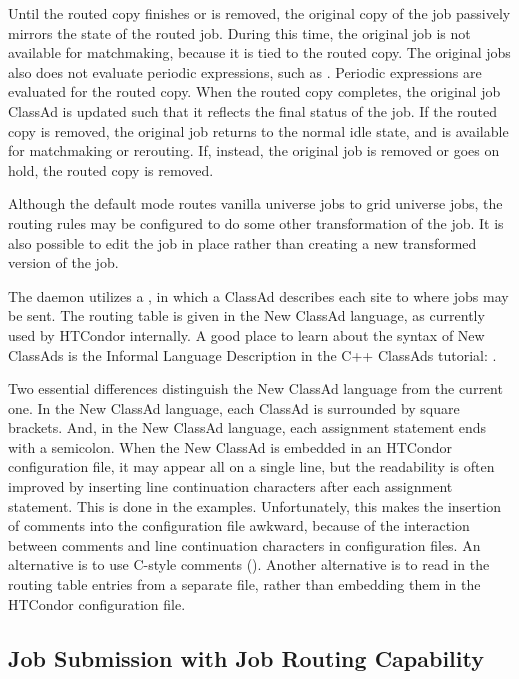 Until the routed copy finishes or is removed,
the original copy of the job passively mirrors the state of the routed job.
During this time,
the original job is not available for matchmaking,
because it is tied to the routed copy.
The original jobs also does not evaluate periodic expressions,
such as .
Periodic expressions are evaluated for the routed copy.
When the routed copy completes,
the original job ClassAd is updated such that it reflects the
final status of the job.
If the routed copy is removed,
the original job returns to the normal idle state,
and is available for matchmaking or rerouting.
If, instead, the original job is removed or goes on hold,
the routed copy is removed.

Although the default mode routes vanilla universe jobs to
grid universe jobs, the routing rules may be configured
to do some other transformation of the job.  It is also
possible to edit the job in place rather than creating
a new transformed version of the job.

The  daemon utilizes a ,
in which a ClassAd describes each site to where jobs may be sent.
The routing table is given in the New ClassAd language,
as currently used by HTCondor internally.
A good place to learn about the syntax of New ClassAds
is the Informal Language Description in the C++ ClassAds
tutorial: .

Two essential differences distinguish the New ClassAd language
from the current one.
In the New ClassAd language,
each ClassAd is surrounded by square brackets.
And, in the New ClassAd language,
each assignment statement ends with a semicolon.
When the New
ClassAd is embedded in an HTCondor configuration file,
it may appear all on a single line,
but the readability is often improved by inserting line continuation
characters
after each assignment statement.
This is done in the examples.
Unfortunately, this makes the insertion of comments into
the configuration file awkward,
because of the interaction between comments and line continuation
characters in configuration files.
An alternative is to use C-style comments (\Code{/* \Dots */}).
Another alternative is to read in the routing table entries
from a separate file,
rather than embedding them in the HTCondor configuration file.

\subsection{\label{sec:RouterJobSubmission}Job Submission with Job Routing Capability}

